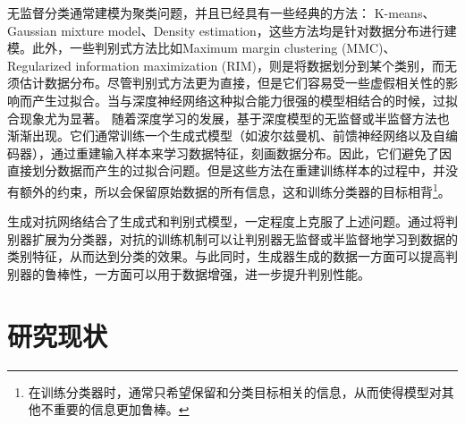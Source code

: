 无监督分类通常建模为聚类问题，并且已经具有一些经典的方法：
K-means、Gaussian mixture model、Density estimation，这些方法均是针对数据分布进行建模。此外，一些判别式方法比如Maximum margin clustering (MMC)\cite{xu2005maximum}、Regularized information maximization (RIM)\cite{krause2010discriminative}，则是将数据划分到某个类别，而无须估计数据分布。尽管判别式方法更为直接，但是它们容易受一些虚假相关性的影响而产生过拟合\cite{springenberg2015unsupervised}。当与深度神经网络这种拟合能力很强的模型相结合的时候，过拟合现象尤为显著。
随着深度学习的发展，基于深度模型的无监督或半监督方法也渐渐出现。它们通常训练一个生成式模型（如波尔兹曼机\cite{salakhutdinov2009deep,goodfellow2013multi}、前馈神经网络\cite{bengio2014deep,kingma2014semi}以及自编码器\cite{hinton2006reducing,vincent2008extracting}），通过重建输入样本来学习数据特征，刻画数据分布。因此，它们避免了因直接划分数据而产生的过拟合问题。但是这些方法在重建训练样本的过程中，并没有额外的约束，所以会保留原始数据的所有信息，这和训练分类器的目标相背\footnote{在训练分类器时，通常只希望保留和分类目标相关的信息，从而使得模型对其他不重要的信息更加鲁棒。}。

生成对抗网络结合了生成式和判别式模型，一定程度上克服了上述问题。通过将判别器扩展为分类器，对抗的训练机制可以让判别器无监督或半监督地学习到数据的类别特征，从而达到分类的效果。与此同时，生成器生成的数据一方面可以提高判别器的鲁棒性，一方面可以用于数据增强，进一步提升判别性能。


\section{研究现状}


